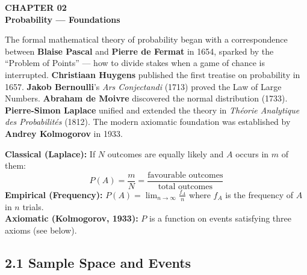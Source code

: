\documentclass[12pt]{article}
\begin{document}
\newpage

\begin{tcolorbox}[enhanced,arc=0pt,boxrule=0pt,colback=primary,colframe=primary,
  left=16pt,right=16pt,top=14pt,bottom=10pt,borderline south={4pt}{0pt}{accent}]
  {\color{accent!70}\small\bfseries CHAPTER 02}\\[4pt]
  {\LARGE\bfseries\color{white}Probability --- Foundations}
\end{tcolorbox}
\vspace{10pt}

\begin{histbox}
The formal mathematical theory of probability began with a correspondence between \textbf{Blaise Pascal} and \textbf{Pierre de Fermat} in 1654, sparked by the ``Problem of Points'' — how to divide stakes when a game of chance is interrupted. \textbf{Christiaan Huygens} published the first treatise on probability in 1657. \textbf{Jakob Bernoulli}'s \textit{Ars Conjectandi} (1713) proved the Law of Large Numbers. \textbf{Abraham de Moivre} discovered the normal distribution (1733). \textbf{Pierre-Simon Laplace} unified and extended the theory in \textit{Théorie Analytique des Probabilités} (1812). The modern axiomatic foundation was established by \textbf{Andrey Kolmogorov} in 1933.
\end{histbox}

\bigskip

\begin{defbox}
\textbf{Classical (Laplace):} If $N$ outcomes are equally likely and $A$ occurs in $m$ of them:
\[P(A)=\frac{m}{N}=\frac{\text{favourable outcomes}}{\text{total outcomes}}\]
\textbf{Empirical (Frequency):} $P(A)=\lim_{n\to\infty}\frac{f_A}{n}$ where $f_A$ is the frequency of $A$ in $n$ trials.\\[4pt]
\textbf{Axiomatic (Kolmogorov, 1933):} $P$ is a function on events satisfying three axioms (see below).
\end{defbox}

\subsection{2.1 Sample Space and Events}
\end{document}
